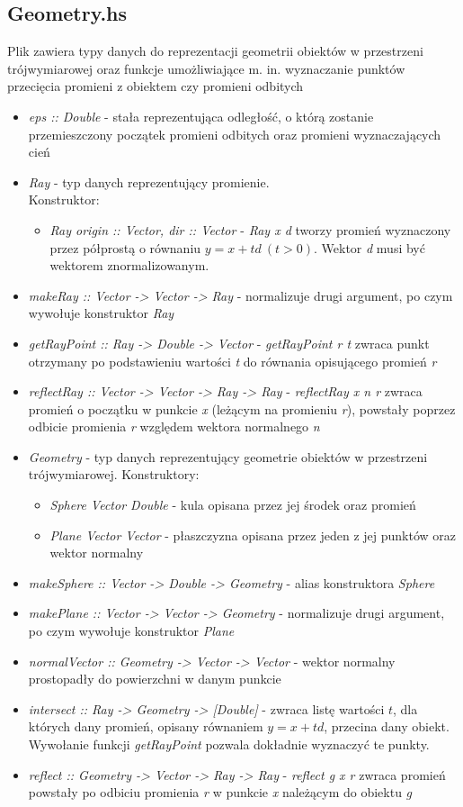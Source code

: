 \documentclass[11pt,a4paper]{article}
\begin{document}
\subsection{Geometry.hs}
Plik zawiera typy danych do reprezentacji geometrii obiektów w przestrzeni trójwymiarowej oraz funkcje umożliwiające m. in. wyznaczanie punktów przecięcia promieni z obiektem czy promieni odbitych
\begin{itemize}
\item\textit{eps :: Double} - stała reprezentująca odległość, o którą zostanie przemieszczony początek promieni odbitych oraz promieni wyznaczających cień
\item\textit{Ray} - typ danych reprezentujący promienie.\\Konstruktor:
\begin{itemize}
\item\textit{Ray { origin :: Vector, dir :: Vector }} - \textit{Ray x d} tworzy promień wyznaczony przez półprostą o równaniu $y = x + td\ (t > 0)$. Wektor \textit{d} musi być wektorem znormalizowanym.
\end{itemize}
\item\textit{makeRay :: Vector -> Vector -> Ray} - normalizuje drugi argument, po czym wywołuje konstruktor \textit{Ray}
\item\textit{getRayPoint :: Ray -> Double -> Vector} - \textit{getRayPoint r t} zwraca punkt otrzymany po podstawieniu wartości \textit{t} do równania opisującego promień \textit{r}
\item\textit{reflectRay :: Vector -> Vector -> Ray -> Ray} - \textit{reflectRay x n r} zwraca promień o początku w punkcie \textit{x} (leżącym na promieniu \textit{r}), powstały poprzez odbicie promienia \textit{r} względem wektora normalnego \textit{n}
\item\textit{Geometry} - typ danych reprezentujący geometrie obiektów w przestrzeni trójwymiarowej. Konstruktory:
\begin{itemize}
\item\textit{Sphere Vector Double} - kula opisana przez jej środek oraz promień
\item\textit{Plane Vector Vector} - płaszczyzna opisana przez jeden z jej punktów oraz wektor normalny
\end{itemize}
\item\textit{makeSphere :: Vector -> Double -> Geometry} - alias konstruktora \textit{Sphere}
\item\textit{makePlane :: Vector -> Vector -> Geometry} - normalizuje drugi argument, po czym wywołuje konstruktor \textit{Plane}
\item\textit{normalVector :: Geometry -> Vector -> Vector} - wektor normalny prostopadły do powierzchni w danym punkcie
\item\textit{intersect :: Ray -> Geometry -> [Double]} - zwraca listę wartości $t$, dla których dany promień, opisany równaniem $y = x+td$, przecina dany obiekt. Wywołanie funkcji \textit{getRayPoint} pozwala dokładnie wyznaczyć te punkty.
\item\textit{reflect :: Geometry -> Vector -> Ray -> Ray} - \textit{reflect g x r} zwraca promień powstały po odbiciu promienia \textit{r} w punkcie \textit{x} należącym do obiektu \textit{g}
\end{itemize}
\end{document}
